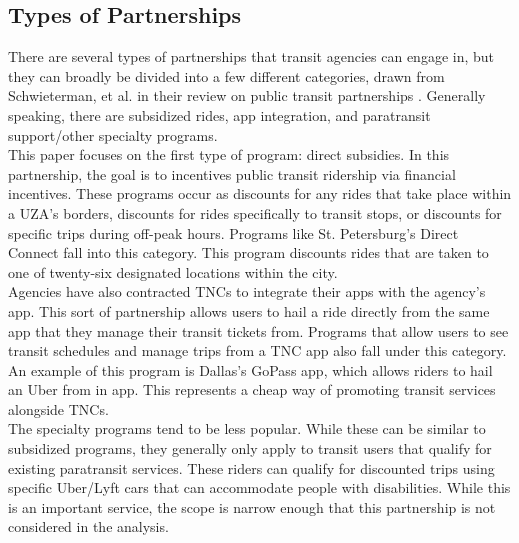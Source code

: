 \documentclass [12pt]{report}
\begin{document}
\subsection*{Types of Partnerships}
There are several types of partnerships that transit agencies can engage in, but they can broadly be divided into a few different categories, drawn from Schwieterman, et al. in their review on public transit partnerships \parencite{depaul}. Generally speaking, there are subsidized rides, app integration, and paratransit support/other specialty programs. \\
\indent This paper focuses on the first type of program: direct subsidies. In this partnership, the goal is to incentives public transit ridership via financial incentives. These programs occur as discounts for any rides that take place within a UZA's borders, discounts for rides specifically to transit stops, or discounts for specific trips during off-peak hours. Programs like St. Petersburg's Direct Connect fall into this category. This program discounts rides that are taken to one of twenty-six designated locations within the city.\\
\indent Agencies have also contracted TNCs to integrate their apps with the agency's app. This sort of partnership allows users to hail a ride directly from the same app that they manage their transit tickets from. Programs that allow users to see transit schedules and manage trips from a TNC app also fall under this category. An example of this program is Dallas's GoPass app, which allows riders to hail an Uber from in app. This represents a cheap way of promoting transit services alongside TNCs.\\
\indent The specialty programs tend to be less popular. While these can be similar to subsidized programs, they generally only apply to transit users that qualify for existing paratransit services. These riders can qualify for discounted trips using specific Uber/Lyft cars that can accommodate people with disabilities. While this is an important service, the scope is narrow enough that this partnership is not considered in the analysis.

\end{document}
